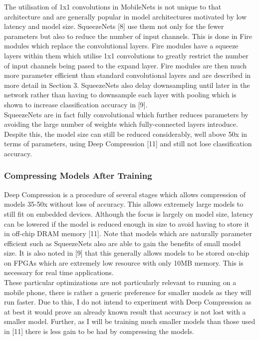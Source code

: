 \documentclass{article}
\begin{document}
The utilisation of 1x1 convolutions in MobileNets is not unique to that architecture and are generally popular in model architectures motivated by low latency and model size. SqueezeNets [8] use them not only for the fewer parameters but also to reduce the number of input channels. This is done in Fire modules which replace the convolutional layers. Fire modules have a squeeze layers within them which utilise 1x1 convolutions to greatly restrict the number of input channels being pased to the expand layer. Fire modules are then much more parameter efficient than standard convolutional layers and are described in more detail in Section 3. SqueezeNets also delay downsampling until later in the network rather than having to downsample each layer with pooling which is shown to increase classification accuracy in [9].\\

SqueezeNets are in fact fully convolutional which further reduces parameters by avoiding the large number of weights which fully-connected layers introduce. Despite this, the model size can still be reduced considerably, well above 50x in terms of parameters, using Deep Compression  [11] and still not lose classification accuracy.\\

\subsubsection{Compressing Models After Training}

Deep Compression is a procedure of several stages which allows compression of models 35-50x without loss of accuracy. This allows extremely large models to still fit on embedded devices. Although the focus is largely on model size, latency can be lowered if the model is reduced enough in size to avoid having to store it in off-chip DRAM memory [11]. Note that models which are naturally parameter efficient such as SqueezeNets also are able to gain the benefits of small model size. It is also noted in [9] that this generally allows models to be stored on-chip on FPGAs which are extremely low resource with only 10MB  memory. This is necessary for real time applications.\\

These particular optimizations are not particularly relevant to running on a mobile phone, there is rather a generic preference for smaller models as they will run faster. Due to this, I do not intend to experiment with Deep Compression as at best it would prove an already known result that accuracy is not lost with a smaller model. Further, as I will be training much smaller models than those used in [11] there is less gain to be had by compressing the models. \\
\end{document}
